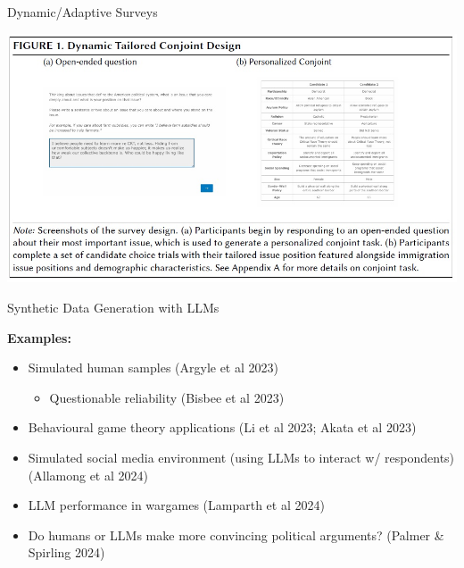 \documentclass[10pt,aspectratio=169]{beamer}
\newcommand{\nb}[1]{{\color{gray} {#1}}}
\newcommand{\nblue}[1]{{\color{ceruleanblue} {#1}}}
\begin{document}
\begin{frame}{Dynamic/Adaptive Surveys}

\nblue{\citet{velez2024confronting}}

\begin{center}
\includegraphics[width=.6\textwidth]{figures/velez_conjoint.jpg}
\end{center}

\end{frame}












\begin{frame}{Synthetic Data Generation with LLMs}

\textbf{Examples:} \medskip 
	\begin{itemize}
	\item Simulated human samples \nb{(Argyle et al 2023) } \medskip 
	\begin{itemize}
		\item Questionable reliability \nb{(Bisbee et al 2023)} 
	\end{itemize}
	
	\medskip
	\item Behavioural game theory applications \nb{(Li et al 2023; Akata et al 2023)}
	
	\medskip
		\item Simulated social media environment (using LLMs to interact w/ respondents) \nb{(Allamong et al 2024)}
			\medskip
		\item LLM performance in wargames \nb{(Lamparth et al 2024)}
		\medskip
		\item Do humans or LLMs make more convincing political arguments? \nb{(Palmer \& Spirling 2024)}
	\end{itemize}
\end{frame}
\end{document}
